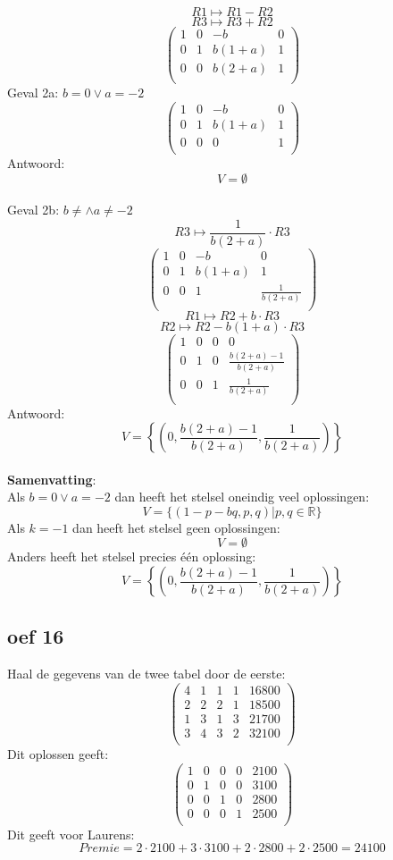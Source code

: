 \documentclass[lineaire_algebra_oplossingen.tex]{subfiles}
\begin{document}
\[ R1 \longmapsto R1 - R2 \]
\[ R3 \longmapsto R3 + R2 \]
\[
\begin{pmatrix}
1 & 0 & -b & 0\\
0 & 1 & b(1+a) & 1\\
0 & 0 & b(2+a) & 1\\
\end{pmatrix}
\]
Geval 2a: $b=0 \vee a=-2$
\[
\begin{pmatrix}
1 & 0 & -b & 0\\
0 & 1 & b(1+a) & 1\\
0 & 0 & 0 & 1\\
\end{pmatrix}
\]
Antwoord:
\[
V=\emptyset
\]\\
Geval 2b: $b\neq \wedge a \neq -2$
\[ R3 \longmapsto \frac{1}{b(2+a)}\cdot R3 \]
\[
\begin{pmatrix}
1 & 0 & -b & 0\\
0 & 1 & b(1+a) & 1\\
0 & 0 & 1 & \frac{1}{b(2+a)}\\
\end{pmatrix}
\]
\[ R1 \longmapsto R2 + b\cdot R3 \]
\[ R2 \longmapsto R2 - b(1+a)\cdot R3 \]
\[
\begin{pmatrix}
1 & 0 & 0 & 0\\
0 & 1 & 0 & \frac{b(2+a)-1}{b(2+a)}\\
0 & 0 & 1 & \frac{1}{b(2+a)}\\
\end{pmatrix}
\]
Antwoord:
\[
V=\left\lbrace\left(0,\frac{b(2+a)-1}{b(2+a)}, \frac{1}{b(2+a)}\right)\right\rbrace
\]\\
\textbf{Samenvatting}:\\
Als  $b=0 \vee a=-2$ dan heeft het stelsel oneindig veel oplossingen:
\[
V = \{ (1-p-bq,p,q) | p,q \in \mathbb{R} \}
\]
Als $k=-1$ dan heeft het stelsel geen oplossingen:
\[
V=\emptyset
\]
Anders heeft het stelsel precies één oplossing:
\[
V=\left\lbrace\left(0,\frac{b(2+a)-1}{b(2+a)}, \frac{1}{b(2+a)}\right)\right\rbrace
\]
\subsection{oef 16}
Haal de gegevens van de twee tabel door de eerste:
\[
\begin{pmatrix}
4 & 1 & 1 & 1 & 16800\\
2 & 2 & 2 & 1 & 18500\\
1 & 3 & 1 & 3 & 21700\\
3 & 4 & 3 & 2 & 32100\\
\end{pmatrix}
\]
Dit oplossen geeft:
\[
\begin{pmatrix}
1 & 0 & 0 & 0 & 2100\\
0 & 1 & 0 & 0 & 3100\\
0 & 0 & 1 & 0 & 2800\\
0 & 0 & 0 & 1 & 2500\\
\end{pmatrix}
\]
Dit geeft voor Laurens:
\[
Premie = 2\cdot 2100 + 3\cdot 3100 + 2\cdot 2800 + 2\cdot 2500 = 24100
\]
\end{document}
